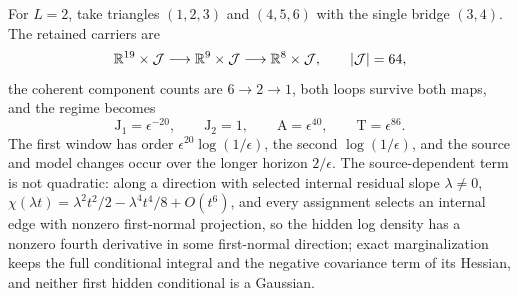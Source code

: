 For \(L=2\), take triangles \((1,2,3)\) and \((4,5,6)\) with the single bridge
\((3,4)\). The retained carriers are
\begin{equation}
\mathbb R^{19}\times\mathcal J
\longrightarrow\mathbb R^9\times\mathcal J
\longrightarrow\mathbb R^8\times\mathcal J,
\qquad |\mathcal J|=64,
\label{eq:rg-formation-two-triangle-carrier}
\end{equation}
the coherent component counts are \(6\to2\to1\), both loops survive both
maps, and the regime becomes
\begin{equation}
\mathrm J_1=\epsilon^{-20},\qquad \mathrm J_2=1,\qquad
\mathrm A=\epsilon^{40},\qquad \mathrm T=\epsilon^{86}.
\label{eq:rg-formation-two-triangle-regime}
\end{equation}
The first window has order \(\epsilon^{20}\log(1/\epsilon)\), the second
\(\log(1/\epsilon)\), and the source and model changes occur over the longer
horizon \(2/\epsilon\). The source-dependent term is not quadratic: along a
direction with selected internal residual slope \(\lambda\ne0\),
\(\chi(\lambda t)=\lambda^2t^2/2-\lambda^4t^4/8+O(t^6)\), and every assignment
selects an internal edge with nonzero first-normal projection, so the hidden
log density has a nonzero fourth derivative in some first-normal direction;
exact marginalization keeps the full conditional integral and the negative
covariance term of its Hessian, and neither first hidden conditional is a
Gaussian. 

